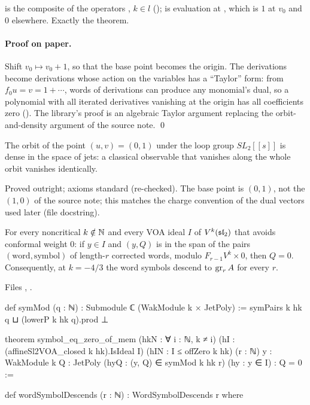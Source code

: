 \begin{dictionary}
 is the composite of the operators , $k\in l$ ();  is evaluation at
, which is $1$ at $v_0$ and $0$ elsewhere. Exactly the theorem.
\end{dictionary}

\paragraph{Proof on paper.} Shift $v_0\mapsto v_0+1$, so that the base point becomes the origin. The derivations become derivations whose action on the
variables has a ``Taylor'' form: from $f_0u=v=1+\cdots$, words of derivations can produce any monomial's dual, so a polynomial with all iterated
derivatives vanishing at the origin has all coefficients zero (). The library's proof is an algebraic Taylor argument replacing
the orbit-and-density argument of the source note. \qed

\begin{physics}
The orbit of the point $(u,v)=(0,1)$ under the loop group $SL_2[[s]]$ is dense in the space of jets: a classical observable that vanishes along the
whole orbit vanishes identically.
\end{physics}

\begin{status}
Proved outright; axioms standard (re-checked). The base point is $(0,1)$, not the $(1,0)$ of the source note; this matches the charge convention of the
dual vectors used later (file docstring).
\end{status}

\begin{theorem}\label{l28:thm:desc}
For every noncritical $k\notin{\mathbb{N}}$ and every VOA ideal $I$ of $V^k(\mathfrak{sl}_2)$ that avoids conformal weight $0$: if $y\in I$ and $(y,Q)$ is in the
span of the pairs $(\text{word},\text{symbol})$ of length-$r$ corrected words, modulo $F_{r-1}V^k\times0$, then $Q=0$. Consequently, at $k=-4/3$ the
word symbols descend to $\operatorname{gr}_rA$ for every $r$.
\end{theorem}

\noindent Files , .
\begin{leancode}
def symMod (q : ℕ) : Submodule ℂ (WakModule k × JetPoly) :=
  symPairs k hk q ⊔ (lowerP k hk q).prod ⊥

theorem symbol_eq_zero_of_mem (hkN : ∀ i : ℕ, k ≠ i)
    (hI : (affineSl2VOA_closed k hk).IsIdeal I) (hIN : I ≤ offZero k hk) (r : ℕ)
    {y : WakModule k} {Q : JetPoly} (hyQ : (y, Q) ∈ symMod k hk r) (hy : y ∈ I) : Q = 0 :=

def wordSymbolDescends (r : ℕ) : WordSymbolDescends r where
\end{leancode}

